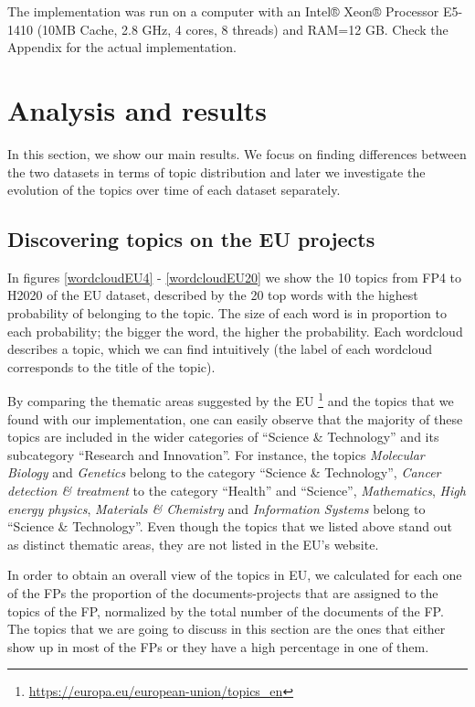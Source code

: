 \documentclass[12pt]{report}
\begin{document}
The implementation was run on a computer with an Intel® Xeon® Processor E5-1410
(10MB Cache, 2.8 GHz, 4 cores, 8 threads) and RAM=12 GB. Check the Appendix for 
the actual implementation.
\pagebreak

\section{Analysis and results}
\label{analysis}
In this section, we show our main results. We focus on finding
differences between the two datasets in terms of topic distribution
and later we investigate the evolution of the topics over time of each
dataset separately.

\subsection{Discovering topics on the EU projects}

In figures \ref{wordcloudEU4} - \ref{wordcloudEU20} we show the 10 topics from FP4 to H2020 of the EU dataset, described by
the 20 top words with the highest probability of belonging
to the topic. The size of each word is in proportion to each
probability; the bigger the word, the higher the probability. 
Each wordcloud describes a topic, which we can find intuitively (the label 
of each wordcloud corresponds to the title of the topic).

By comparing the thematic areas suggested by the EU
\footnote{\url{https://europa.eu/european-union/topics_en}} and the topics that
we found with our implementation, one can easily observe that the majority of
these topics are included in the wider categories of ``Science \& Technology''
and its subcategory ``Research and Innovation''. For instance, the topics
\emph{Molecular Biology} and \emph{Genetics} belong to the category ``Science \&
Technology'', \emph{Cancer detection \& treatment} to the category ``Health''
and ``Science'', \emph{Mathematics}, \emph{High energy physics}, \emph{Materials
\& Chemistry} and \emph{Information Systems} belong to ``Science \&
Technology''. Even though the topics that we listed above stand out as distinct
thematic areas, they are not listed in the EU's website.

In order to obtain an overall view of the topics in EU, we calculated for each
one of the FPs the proportion of the documents-projects that are assigned to the
topics of the FP, normalized by the total number of the documents of the FP. The
topics that we are going to discuss in this section are the ones that either
show up in most of the FPs or they have a high percentage in one of them.
\end{document}
